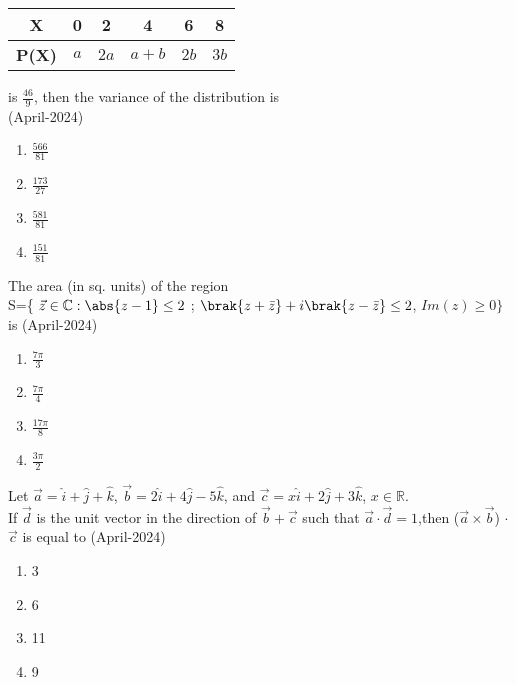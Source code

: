 \begin{table}[h!]    
  \centering
 \begin{tabular}[12pt]{ |c| c| c| c| c| c|}
    \hline
    \textbf{X} & 0 & 2 & 4 & 6 & 8 \\ 
    \hline
    \textbf{P(X)} & $a$ & $2a$ & $a+b$ & $2b$ & $3b$ \\
    \hline   
    \end{tabular}
\end{table}
is $\frac{46}{9}$, then the variance of the distribution is \\
\hfill{(April-2024)}
\begin{multicols}{2}
\begin{enumerate}
\item $\frac{566}{81}$
\item  $\frac{173}{27}$
\item $\frac{581}{81}$
\item $\frac{151}{81}$
\end{enumerate}
\end{multicols}
\item The area (in sq. units) of the region \\
S=\{ $\vec{z} \in \mathbb{C}:\abs{z - 1} \leq 2$ ; $\brak{z + \bar{z}} + i\brak{z - \bar{z}} \leq 2$, $Im(z) \geq 0 \}$ is
\hfill{(April-2024)}
\begin{multicols}{2}
\begin{enumerate}
\item $\frac{7\pi}{3}$
\item $\frac{7\pi}{4}$
\item $\frac{17\pi}{8}$
\item $\frac{3\pi}{2}$
\end{enumerate}
\end{multicols}
\item Let $\vec{a} = \hat{i} + \hat{j} + \hat{k}$, $\vec{b} = 2\hat{i} + 4\hat{j} - 5\hat{k}$, and $\vec{c} = x\hat{i} + 2\hat{j} + 3\hat{k}$, $x \in \mathbb{R}$. \\
If $\vec{d}$  is the unit vector in the direction of  $\vec{b} + \vec{c}$ such that $ \vec{a} \cdot \vec{d} = 1$,then ($\vec{a} \times \vec{b}$) $\cdot$ $\vec{c}$ is equal to 
\hfill{(April-2024)}
\begin{multicols}{2}
\begin{enumerate}
\item 3
\item 6
\item 11
\item 9
\end{enumerate}
\end{multicols}

